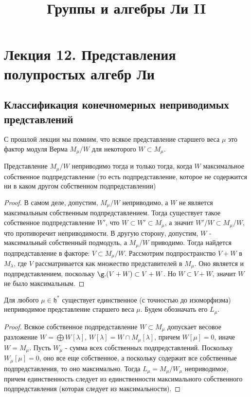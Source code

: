 \documentclass[a4article]{article}
\title{Группы и алгебры Ли II}
\author{}
\date{}
\begin{document}
\maketitle

\section*{Лекция 12. Представления полупростых алгебр Ли}

\subsection*{Классификация конечномерных неприводимых представлений}
С прошлой лекции мы помним, что всякое представление старшего веса $\mu$ это фактор модуля Верма $M_{\mu}/W$ для некоторого $W \subset M_{\mu}$.
\begin{lemma}
\label{maximal_proper}
    Представление $M_{\mu}/W$ неприводимо тогда и только тогда, когда $W$ максимальное собственное подпредставление (то есть подпредставление, которое не содержится ни в каком другом собственном подпредставлении)
\end{lemma}
\begin{proof}
    В самом деле, допустим, $M_{\mu}/W$ неприводимо, а $W$ не является максимальным собственным подпредставлением. Тогда существует такое собственное подпредставление $W'$, что $W \subset W' \subset M_{\mu}$, а значит $W'/W \subset M_{\mu}/W$, что противоречит неприводимости. В другую сторону, допустим, $W$ - максимальный собственный подмодуль, а $M_{\mu}/W$ приводимо. Тогда найдется подпредставление в факторе: $V \subset M_{\mu}/W$. Рассмотрим подпространство $V+W$ в $M_{\lambda}$, где $V$ рассматривается как множество представителей в $M_{\mu}$. Оно является и подпредставлением, поскольку $\g.(V+W) \subset V+W$. Но $W \subset V+W$, значит $W$ не было максимальным.
\end{proof}
\begin{theorem}
    Для любого $\mu \in \mathfrak{h^*}$ существует единственное (с точностью до изоморфизма) неприводимое представление старшего веса $\mu$. Будем обозначать его $L_{\mu}$.
\end{theorem}
\begin{proof}
    Всякое собственное подпредставление $W \subset M_{\mu}$ допускает весовое разложение $W = \bigoplus W[\lambda]$, $W[\lambda] = W \cap M_{\mu}[\lambda]$, причем $W[\mu]=0$, иначе $W=M_{\mu}$. Пусть $W_{\mu}$ - сумма всех собственных подпредставлений. Поскольку $W_{\mu}[\mu]=0$, оно все еще собственное, а поскольку содержит все собственные подпредставления, то оно максимально. Тогда $L_{\mu}=M_{\mu}/W_{\mu}$ неприводимое, причем единственность следует из единственности максимального собственного подпредставления (которая следует из максимальности). 
\end{proof}
\end{document}
